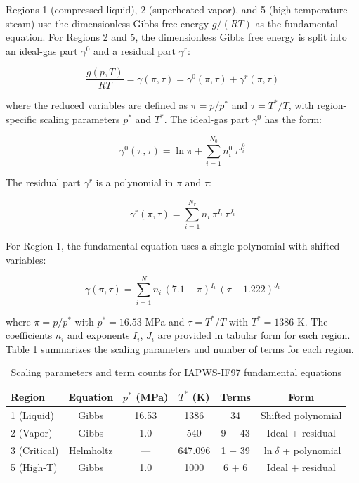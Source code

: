 \documentclass{article}
\begin{document}
Regions 1 (compressed liquid), 2 (superheated vapor), and 5 (high-temperature steam) use the dimensionless Gibbs free energy $g/(RT)$ as the fundamental equation. For Regions 2 and 5, the dimensionless Gibbs free energy is split into an ideal-gas part $\gamma^0$ and a residual part $\gamma^r$:

\begin{equation}
\frac{g(p,T)}{RT} = \gamma(\pi,\tau) = \gamma^0(\pi,\tau) + \gamma^r(\pi,\tau)
\label{eq:gibbs}
\end{equation}

where the reduced variables are defined as $\pi = p/p^{*}$ and $\tau = T^{*}/T$, with region-specific scaling parameters $p^{*}$ and $T^{*}$. The ideal-gas part $\gamma^0$ has the form:

\begin{equation}
\gamma^0(\pi,\tau) = \ln\pi + \sum_{i=1}^{N_0} n_i^0 \, \tau^{J_i^0}
\label{eq:gibbs_ideal}
\end{equation}

The residual part $\gamma^r$ is a polynomial in $\pi$ and $\tau$:

\begin{equation}
\gamma^r(\pi,\tau) = \sum_{i=1}^{N_r} n_i \, \pi^{I_i} \, \tau^{J_i}
\label{eq:gibbs_residual}
\end{equation}

For Region 1, the fundamental equation uses a single polynomial with shifted variables:

\begin{equation}
\gamma(\pi,\tau) = \sum_{i=1}^{N} n_i \, (7.1 - \pi)^{I_i} \, (\tau - 1.222)^{J_i}
\label{eq:gibbs_r1}
\end{equation}

where $\pi = p/p^{*}$ with $p^{*} = 16.53$ MPa and $\tau = T^{*}/T$ with $T^{*} = 1386$ K. The coefficients $n_i$ and exponents $I_i$, $J_i$ are provided in tabular form for each region. Table \ref{tab:region_params} summarizes the scaling parameters and number of terms for each region.

\begin{table}[H]
\centering
\caption{Scaling parameters and term counts for IAPWS-IF97 fundamental equations}
\label{tab:region_params}
\begin{tabular}{lccccc}
\toprule
\textbf{Region} & \textbf{Equation} & \textbf{$p^{*}$ (MPa)} & \textbf{$T^{*}$ (K)} & \textbf{Terms} & \textbf{Form} \\
\midrule
1 (Liquid) & Gibbs & 16.53 & 1386 & 34 & Shifted polynomial \\
2 (Vapor) & Gibbs & 1.0 & 540 & 9 + 43 & Ideal + residual \\
3 (Critical) & Helmholtz & --- & 647.096 & 1 + 39 & $\ln\delta$ + polynomial \\
5 (High-T) & Gibbs & 1.0 & 1000 & 6 + 6 & Ideal + residual \\
\bottomrule
\end{tabular}
\end{table}
\end{document}
